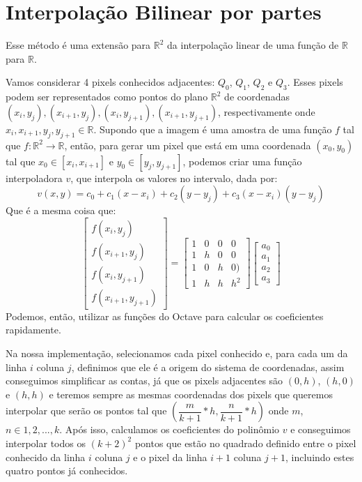 \documentclass{article}
\begin{document}
	\section{Interpolação Bilinear por partes}
	Esse método é uma extensão para $\mathbb{R}^2$ da interpolação linear de uma função de $\mathbb{R}$ para $\mathbb{R}$. \par
	Vamos considerar 4 pixels conhecidos adjacentes: $Q_{0}$, $Q_{1}$, $Q_{2}$ e $Q_{3}$. Esses pixels podem ser representados como pontos do plano $\mathbb{R}^2$ de coordenadas $(x_{i}, y_{j}), (x_{i+1}, y_{j}), (x_{i}, y_{j+1}), (x_{i+1}, y_{j+1})$, respectivamente onde $x_{i}, x_{i+1}, y_{j}, y_{j+1} \in \mathbb{R}$. Supondo que a imagem é uma amostra de uma função $f$ tal que $f: \mathbb{R}^2 \rightarrow \mathbb{R} $, então, para gerar um pixel que está em uma coordenada $(x_{0}, y_{0})$ tal que $x_{0} \in [x_{i}, x_{i+1}]$ e $y_{0} \in [y_{j}, y_{j+1}]$, podemos criar uma função interpoladora $v$, que interpola os valores no intervalo, dada por:
	 \begin{equation}
	 v(x, y) = c_{0} + c_{1}(x - x_{i}) + c_{2}(y - y_{j}) + c_{3}(x - x_{i})(y - y_{j})
	 \end{equation}
	 Que é a mesma coisa que:
	 \[
	 	\left[
	 		\begin{array}{llll}
				f(x_{i}, y_{j})\\
				f(x_{i+1}, y_{j})\\
				f(x_{i}, y_{j+1})\\
				f(x_{i+1}, y_{j+1})	 		
	 		\end{array}
	 	\right]
	 	=
	 	\left[
	 		\begin{array}{llll}
				1 & 0 & 0 & 0\\
				1 & h & 0 & 0\\
				1 & 0 & h & 0)\\
				1 & h & h & h^2	 		
	 		\end{array}
	 	\right]
	 	\left[
	 		\begin{array}{llll}
				a_{0}\\
				a_{1}\\
				a_{2}\\
				a_{3}	 		
	 		\end{array}
	 	\right]
	 \]
	 Podemos, então, utilizar as funções do Octave para calcular os coeficientes rapidamente. \par
	 Na nossa implementação, selecionamos cada pixel conhecido e, para cada um da linha $i$ coluna $j$, definimos que ele é a origem do sistema de coordenadas, assim conseguimos simplificar as contas, já que os pixels adjacentes são $(0, h)$, $(h,0)$ e $(h,h)$ e teremos sempre as mesmas coordenadas dos pixels que queremos interpolar que serão os pontos tal que $(\dfrac{m}{k+1}*h, \dfrac{n}{k+1}*h)$ onde $m$, $n \in {1, 2, ..., k}$. Após isso, calculamos os coeficientes do polinômio $v$ e conseguimos interpolar todos os $(k+2)^2$ pontos que estão no quadrado definido entre o pixel conhecido da linha $i$ coluna $j$ e o pixel da linha $i+1$ coluna $j+1$, incluindo estes quatro pontos já conhecidos.\par
\end{document}
